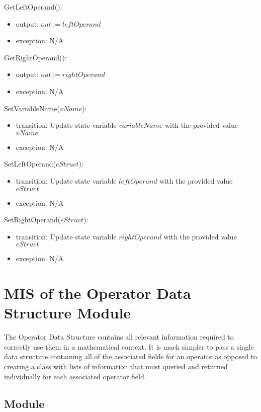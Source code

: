 \documentclass[12pt, titlepage]{article}
\begin{document}
\noindent GetLeftOperand():
\begin{itemize}
	\item output: $out := leftOperand$
	\item exception: N/A
\end{itemize}

\noindent GetRightOperand():
\begin{itemize}
	\item output: $out := rightOperand$
	\item exception: N/A
\end{itemize}

\noindent SetVariableName($vName$):
\begin{itemize}
	\item transition: Update state variable $variableName$ with the provided 
	value $vName$
	\item exception: N/A
\end{itemize}

\noindent SetLeftOperand($eStruct$):
\begin{itemize}
	\item transition: Update state variable $leftOperand$ with the provided 
	value $eStruct$
	\item exception: N/A
\end{itemize}

\noindent SetRightOperand($eStruct$):
\begin{itemize}
	\item transition: Update state variable $rightOperand$ with the provided 
	value $eStruct$
	\item exception: N/A
\end{itemize}

\newpage

\section{MIS of the Operator Data Structure Module} 
\label{Module_operatordatastructure}
The Operator Data Structure contains all relevant information required to 
correctly use them in a mathematical context. It is much simpler to pass a 
single data structure containing all of the associated fields for an operator 
as opposed to creating a class with lists of information that must queried and 
returned individually for each associated operator field.

\subsection{Module}
\end{document}
